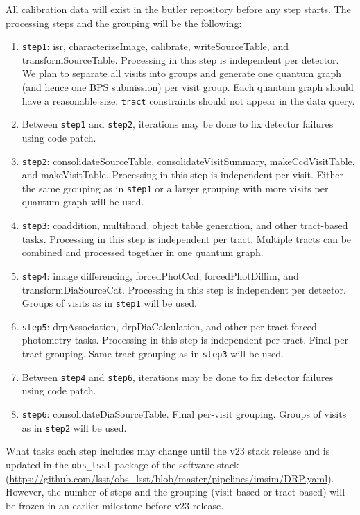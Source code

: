 All calibration data will exist in the butler repository before any step starts.
The processing steps and the grouping will be the following:
\begin{enumerate}
  \item \texttt{step1}: isr, characterizeImage, calibrate, writeSourceTable, and transformSourceTable. Processing in this step is independent per detector. We plan to separate all visits into groups and generate one quantum graph (and hence one BPS submission) per visit group. Each quantum graph should have a reasonable size.
\texttt{tract} constraints should not appear in the data query.
  \item Between \texttt{step1} and \texttt{step2}, iterations may be done to fix detector failures using code patch.
  \item \texttt{step2}: consolidateSourceTable, consolidateVisitSummary, makeCcdVisitTable, and makeVisitTable. Processing in this step is independent per visit. Either the same grouping as in \texttt{step1} or a larger grouping with more visits per quantum graph will be used.
  \item \texttt{step3}: coaddition, multiband, object table generation, and other tract-based tasks. Processing in this step is independent per tract. Multiple tracts can be combined and processed together in one quantum graph.
  \item \texttt{step4}: image differencing, forcedPhotCcd, forcedPhotDiffim, and transformDiaSourceCat. Processing in this step is independent per detector. Groups of visits as in \texttt{step1} will be used.
  \item \texttt{step5}: drpAssociation, drpDiaCalculation, and other per-tract forced photometry tasks.
Processing in this step is independent per tract.
Final per-tract grouping.
Same tract grouping as in \texttt{step3} will be used.
  \item Between \texttt{step4} and \texttt{step6}, iterations may be done to fix detector failures using code patch.
  \item \texttt{step6}: consolidateDiaSourceTable. Final per-visit grouping. Groups of visits as in \texttt{step2} will be used.
\end{enumerate}

What tasks each step includes may change until the v23 stack release and is updated in the \texttt{obs\_lsst} package of the software stack (\url{https://github.com/lsst/obs_lsst/blob/master/pipelines/imsim/DRP.yaml}).
However, the number of steps and the grouping (visit-based or tract-based) will be frozen in an earlier milestone before v23 release.

